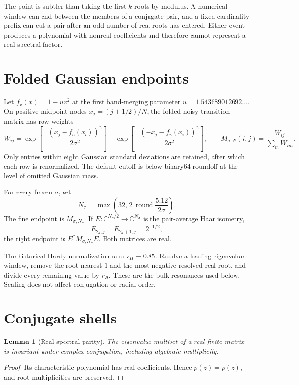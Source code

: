 \documentclass[11pt]{article}
\newtheorem{lemma}[theorem]{Lemma}
\theoremstyle{remark}\newtheorem{remark}[theorem]{Remark}
\newcommand{\C}{\mathbb C}
\begin{document}
The point is subtler than taking the first $k$ roots by modulus. A numerical
window can end between the members of a conjugate pair, and a fixed
cardinality prefix can cut a pair after an odd number of real roots has
entered. Either event produces a polynomial with nonreal coefficients and
therefore cannot represent a real spectral factor.

\section{Folded Gaussian endpoints}

Let $f_u(x)=1-ux^2$ at the first band-merging parameter
$u=1.543689012692\ldots$. On positive midpoint nodes
$x_j=(j+1/2)/N$, the folded noisy transition matrix has row weights
\begin{equation}\label{eq:weights}
 W_{ij}=
 \exp\!\left[-\frac{(x_j-f_u(x_i))^2}{2\sigma^2}\right]
 +\exp\!\left[-\frac{(-x_j-f_u(x_i))^2}{2\sigma^2}\right],
 \qquad
 M_{\sigma,N}(i,j)=\frac{W_{ij}}{\sum_m W_{im}}.
\end{equation}
Only entries within eight Gaussian standard deviations are retained, after
which each row is renormalized. The default cutoff is below binary64
roundoff at the level of omitted Gaussian mass.

For every frozen $\sigma$, set
\begin{equation}
 N_\sigma=
 \max\!\left(32,\,
 2\,\operatorname{round}\frac{5.12}{2\sigma}\right).
\end{equation}
The fine endpoint is $M_{\sigma,N_\sigma}$. If
$E:\C^{N_\sigma/2}\to\C^{N_\sigma}$ is the pair-average Haar isometry,
\begin{equation}
 E_{2j,j}=E_{2j+1,j}=2^{-1/2},
\end{equation}
the right endpoint is $E^*M_{\sigma,N_\sigma}E$. Both matrices are real.

The historical Hardy normalization uses $r_H=0.85$. Resolve a leading
eigenvalue window, remove the root nearest $1$ and the most negative resolved
real root, and divide every remaining value by $r_H$. These are the bulk
resonances used below. Scaling does not affect conjugation or radial order.

\section{Conjugate shells}

\begin{lemma}[Real spectral parity]\label{lem:conj}
The eigenvalue multiset of a real finite matrix is invariant under complex
conjugation, including algebraic multiplicity.
\end{lemma}
\begin{proof}
Its characteristic polynomial has real coefficients. Hence
$p(\overline z)=\overline{p(z)}$, and root multiplicities are preserved.
\end{proof}
\end{document}
